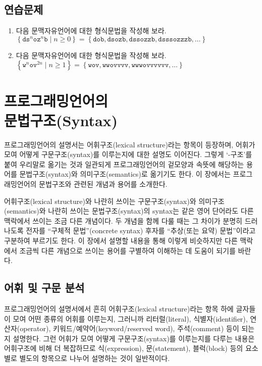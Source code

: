 \section*{연습문제}
\begin{enumerate}
\item 다음 문맥자유언어에 대한 형식문법을 작성해 보라.\\
$\displaystyle
 \left\{ \mathtt{d}\mathtt{s}^n\mathtt{o}\mathtt{z}^n\mathtt{b}
           \mid
           n\ge0 \right\}
 =
 \left\{ \mathtt{dob}
       , \mathtt{dsozb}
       , \mathtt{dssozzb}
       , \mathtt{dsssozzzb}
       , \ldots \right\}$

\item 다음 문맥자유언어에 대한 형식문법을 작성해 보라.\\
$\displaystyle
 \left\{ \mathtt{w}^n\mathtt{o}\mathtt{v}^{2n}
           \mid
           n\ge1 \right\}
 =
 \left\{ \mathtt{wov}
       , \mathtt{wwovvvv}
       , \mathtt{wwwovvvvvv}
       , \ldots \right\}$
\end{enumerate}

\chapter[프로그래밍언어의 문법구조(Syntax)]{프로그래밍언어의\\문법구조(Syntax)}
프로그래밍언어의 설명서는 어휘구조(lexical structure)라는 항목이
등장하며, 어휘가 모여 어떻게 구문구조(syntax)를 이루는지에 대한
설명도 이어진다. 그렇게 `-구조'를 붙여 우리말로 옮기는 것과 일관되게
프로그래밍언어의 겉모양과 속뜻에 해당하는 용어를 문법구조(syntax)와
의미구조(semantics)로 옮기기도 한다. 이 장에서는 프로그래밍언어의
문법구조와 관련된 개념과 용어를 소개한다.

어휘구조(lexical structure)와 나란히 쓰이는 구문구조(syntax)와
의미구조(semantics)와 나란히 쓰이는 문법구조(syntax)의
syntax는 같은 영어 단어라도 다른 맥락에서 쓰이는 조금 다른 개념이다.
두 개념을 함께 다룰 때는 그 차이가 분명히 드러나도록
전자를 ``구체적 문법''(concrete syntax) 후자를
``추상(또는 요약) 문법''이라고 구분하여 부르기도 한다.
이 장에서 설명할 내용을 통해 이렇게 비슷하지만 다른 맥락에서
조금씩 다른 개념으로 쓰이는 용어를 구별하여 이해하는 데 도움이
되기를 바란다.

\newpage

\section{어휘 및 구문 분석}
\label{sec:LexParse}
프로그래밍언어의 설명서\cite{Swift5Ref,CSharp6Draft,JavaSE8spec,Haskell2010}에서
흔히 어휘구조(lexical structure)라는 항목 하에 글자들이 모여 어떤 종류의
어휘를 이루는지, 그러니까 리터럴(literal), 식별자(identifier), 연산자(operator),
키워드/예약어(keyword/reserved word), 주석(comment) 등이 되는지 설명한다.
그런 어휘가 모여 어떻게 구문구조(syntax)를 이루는지를 다루는 내용은
어휘구조에 비해 더 복잡하므로 식(expression), 문(statement), 블럭(block) 등의
요소별로 별도의 항목으로 나누어 설명하는 것이 일반적이다.

